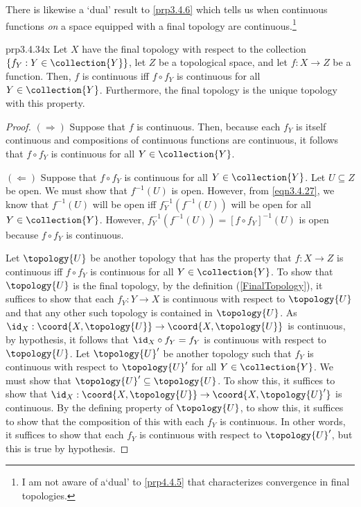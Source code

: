 There is likewise a `dual' result to \cref{prp3.4.6} which tells us when continuous functions \emph{on} a space equipped with a final topology are continuous.\footnote{I am not aware of a`dual' to \cref{prp4.4.5} that characterizes convergence in final topologies.}
\begin{prp}{}{prp3.4.34x}
Let $X$ have the final topology with respect to the collection $\{ f_Y:Y\in \collection{Y}\}$, let $Z$ be a topological space, and let $f\colon X\rightarrow Z$ be a function.  Then, $f$ is continuous iff $f\circ f_Y$ is continuous for all $Y\in \collection{Y}$.  Furthermore, the final topology is the unique topology with this property.
\begin{proof}
$(\Rightarrow )$ Suppose that $f$ is continuous.  Then, because each $f_Y$ is itself continuous and compositions of continuous functions are continuous, it follows that $f\circ f_Y$ is continuous for all $Y\in \collection{Y}$.

\blankline
\noindent
$(\Leftarrow )$ Suppose that $f\circ f_Y$ is continuous for all $Y\in \collection{Y}$.  Let $U\subseteq Z$ be open.  We must show that $f^{-1}(U)$ is open.  However, from \eqref{eqn3.4.27}, we know that $f^{-1}(U)$ will be open iff $f_Y^{-1}\left( f^{-1}(U)\right)$ will be open for all $Y\in \collection{Y}$.  However, $f_Y^{-1}\left( f^{-1}(U)\right) =[f\circ f_Y]^{-1}(U)$ is open because $f\circ f_Y$ is continuous.

\blankline
\noindent
Let $\topology{U}$ be another topology that has the property that $f\colon X\rightarrow Z$ is continuous iff $f\circ f_Y$ is continuous for all $Y\in \collection{Y}$.  To show that $\topology{U}$ is the final topology, by the definition (\cref{FinalTopology}), it suffices to show that each $f_Y:Y\rightarrow X$ is continuous with respect to $\topology{U}$ and that any other such topology is contained in $\topology{U}$.  As $\id _X:\coord{X,\topology{U}}\rightarrow \coord{X,\topology{U}}$ is continuous, by hypothesis, it follows that $\id _X\circ f_Y=f_Y$ is continuous with respect to $\topology{U}$.  Let $\topology{U}'$ be another topology such that $f_Y$ is continuous with respect to $\topology{U}'$ for all $Y\in \collection{Y}$.  We must show that $\topology{U}'\subseteq \topology{U}$.  To show this, it suffices to show that $\id _X:\coord{X,\topology{U}}\rightarrow \coord{X,\topology{U}'}$ is continuous.  By the defining property of $\topology{U}$, to show this, it suffices to show that the composition of this with each $f_Y$ is continuous.  In other words, it suffices to show that each $f_Y$ is continuous with respect to $\topology{U}'$, but this is true by hypothesis.
\end{proof}
\end{prp}

